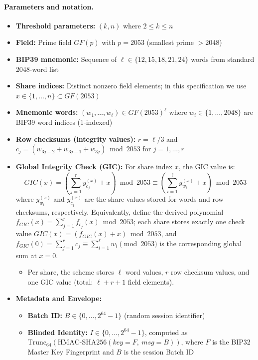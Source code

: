 \documentclass[11pt]{article}
\begin{document}
\paragraph{Parameters and notation.}
\begin{itemize}[noitemsep]
    \item \textbf{Threshold parameters:} $(k, n)$ where $2 \leq k \leq n$
    \item \textbf{Field:} Prime field $GF(p)$ with $p = 2053$ (smallest prime $> 2048$)
    \item \textbf{BIP39 mnemonic:} Sequence of $\ell \in \{12, 15, 18, 21, 24\}$ words from standard 2048-word list
    \item \textbf{Share indices:} Distinct nonzero field elements; in this specification we use $x \in \{1, \ldots, n\} \subset GF(2053)$
    \item \textbf{Mnemonic words:} $(w_1, \ldots, w_\ell) \in GF(2053)^{\ell}$ where $w_i \in \{1, \ldots, 2048\}$ are BIP39 word indices (1-indexed)
    \item \textbf{Row checksums (integrity values):} $r = \ell/3$ and $c_j = (w_{3j-2} + w_{3j-1} + w_{3j}) \bmod 2053$ for $j = 1, \ldots, r$
    \item \textbf{Global Integrity Check (GIC):} For share index $x$, the GIC value is:
    \[
    GIC(x) = \left(\sum_{j=1}^{r} y_{c_j}^{(x)} + x\right) \bmod 2053 \equiv \left(\sum_{i=1}^{\ell} y_{w_i}^{(x)} + x\right) \bmod 2053
    \]
    where $y_{w_i}^{(x)}$ and $y_{c_j}^{(x)}$ are the share values stored for words and row checksums, respectively.
    Equivalently, define the derived polynomial $f_{GIC}(x) = \sum_{j=1}^{r} f_{c_j}(x) \bmod 2053$; each share stores exactly one check value $GIC(x) = (f_{GIC}(x) + x) \bmod 2053$, and $f_{GIC}(0) = \sum_{j=1}^{r} c_j \equiv \sum_{i=1}^{\ell} w_i \pmod{2053}$ is the corresponding global sum at $x=0$.
    \begin{itemize}[noitemsep]
        \item Per share, the scheme stores $\ell$ word values, $r$ row checksum values, and one GIC value (total: $\ell + r + 1$ field elements).
    \end{itemize}
    \item \textbf{Metadata and Envelope:}
    \begin{itemize}[noitemsep]
        \item \textbf{Batch ID:} $B \in \{0, \ldots, 2^{64}-1\}$ (random session identifier)
        \item \textbf{Blinded Identity:} $I \in \{0, \ldots, 2^{64}-1\}$, computed as $\text{Trunc}_{64}(\text{HMAC-SHA256}(key=F,\ msg=B))$, where $F$ is the BIP32 Master Key Fingerprint and $B$ is the session Batch ID

\end{itemize}
\end{itemize}
\end{document}
